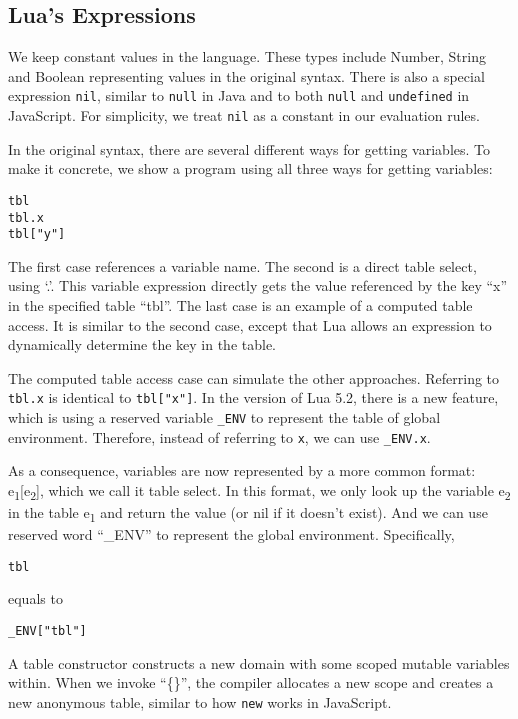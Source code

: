 \subsection{Lua's Expressions}
We keep constant values in the language.
These types include Number, String and Boolean representing values in the original syntax.
There is also a special expression {\tt nil}, similar to {\tt null} in Java and to both {\tt null} and {\tt undefined} in JavaScript.
For simplicity, we treat {\tt nil} as a constant in our evaluation rules.

In the original syntax,
there are several different ways for getting variables.
To make it concrete, we show a program using all three ways for getting variables:

\begin{verbatim}
tbl
tbl.x
tbl["y"]
\end{verbatim}

The first case references a variable name.
The second is a direct table select, using `.'.
This variable expression directly gets the value referenced by the key ``x'' in the specified table ``tbl''.
The last case is an example of a computed table access.
It is similar to the second case, except that Lua allows an expression to dynamically determine the key in the table.

The computed table access case can simulate the other approaches.
Referring to {\tt tbl.x} is identical to {\tt tbl["x"]}.
In the version of Lua 5.2, there is a new feature, which is using a reserved variable {\tt \_ENV} to represent the table of global environment.
Therefore, instead of referring to {\tt x}, we can use {\tt \_ENV.x}.

As a consequence, variables are now represented by a more common format: e\textsubscript{1}[e\textsubscript{2}], which we call it table select. In this format, we only look up the variable e\textsubscript{2} in the table e\textsubscript{1} and return the value (or nil if it doesn't exist). And we can use reserved word ``\_ENV'' to represent the global environment. Specifically,

\begin{verbatim}
tbl
\end{verbatim}
equals to
\begin{verbatim}
_ENV["tbl"]
\end{verbatim}

A table constructor
constructs a new domain with some scoped mutable variables within.
When we invoke ``\{\}'', the compiler allocates a new scope
and creates a new anonymous table, similar to how {\tt new} works in JavaScript.


